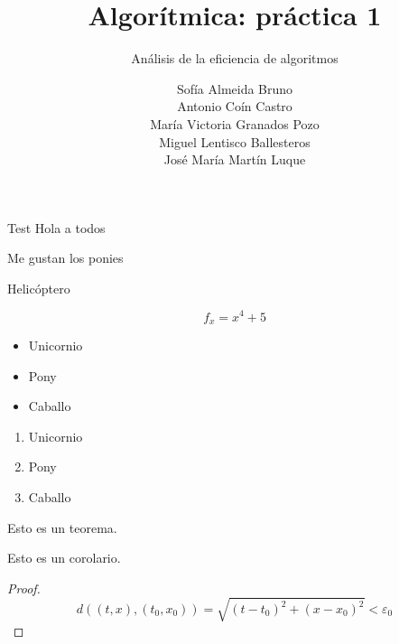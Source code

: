 \documentclass[spanish]{beamer}
\title{Algorítmica: práctica 1}
\subtitle{Análisis de la eficiencia de algoritmos}
\author{Sofía Almeida Bruno\\ Antonio Coín Castro\\ María Victoria Granados Pozo\\ Miguel Lentisco Ballesteros\\ José María Martín Luque}
\begin{document}
\maketitle

\begin{frame}{Test}
	Hola a todos
	
	Me gustan los ponies
	
	Helicóptero
	
	$$ f_x = x^4+5$$
\end{frame}

\begin{frame}
	\begin{itemize}
		\item Unicornio
		\item Pony
		\item Caballo
	\end{itemize}
\end{frame}

\begin{frame}
	\begin{enumerate}
		\item Unicornio
		\item Pony
		\item Caballo
	\end{enumerate}
\end{frame}

\begin{frame}
	\begin{theorem}
		Esto es un teorema.
	\end{theorem}
	\begin{corollary}
		Esto es un corolario.
	\end{corollary}
	\begin{proof}
		$$d((t, x), (t_0, x_0)) = \sqrt{(t-t_0)^2 + (x-x_0)^2} < \varepsilon_0$$
	\end{proof}
\end{frame}

\begin{frame}
	\begin{center}
		
	\end{center}
\end{frame}

\begin{frame}
	\begin{center}
		
	\end{center}
\end{frame}
\end{document}
